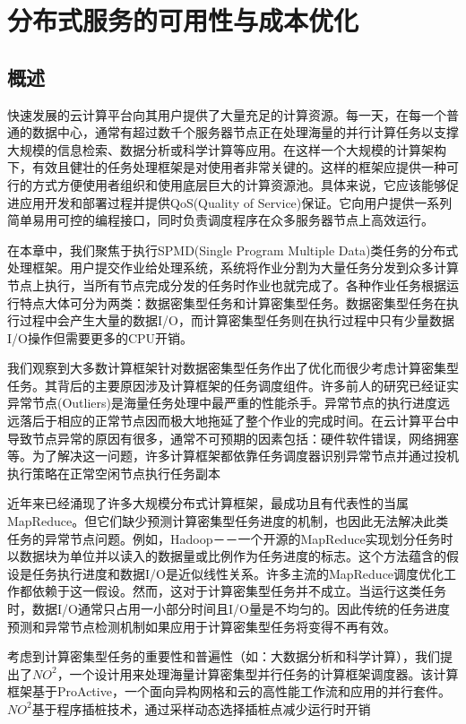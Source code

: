 \chapter{分布式服务的可用性与成本优化}
\label{cha:jupiter}

\section{概述}
\label{sec:ano}
快速发展的云计算平台向其用户提供了大量充足的计算资源。每一天，在每一个普通的数据中心，通常有超过数千个服务器节点正在处理海量的并行计算任务以支撑大规模的信息检索、数据分析或科学计算等应用。在这样一个大规模的计算架构下，有效且健壮的任务处理框架是对使用者非常关键的。这样的框架应提供一种可行的方式方便使用者组织和使用底层巨大的计算资源池。具体来说，它应该能够促进应用开发和部署过程并提供QoS(Quality of Service)保证。它向用户提供一系列简单易用可控的编程接口，同时负责调度程序在众多服务器节点上高效运行。

在本章中，我们聚焦于执行SPMD(Single Program Multiple Data)类任务的分布式处理框架。用户提交作业给处理系统，系统将作业分割为大量任务分发到众多计算节点上执行，当所有节点完成分发的任务时作业也就完成了。各种作业任务根据运行特点大体可分为两类：数据密集型任务和计算密集型任务。数据密集型任务在执行过程中会产生大量的数据I/O，而计算密集型任务则在执行过程中只有少量数据I/O操作但需要更多的CPU开销。

我们观察到大多数计算框架针对数据密集型任务作出了优化而很少考虑计算密集型任务。其背后的主要原因涉及计算框架的任务调度组件。许多前人的研究\cite{Zaharia:2008:IMP:1855741.1855744, Ananthanarayanan:2010:ROM:1924943.1924962}已经证实异常节点(Outliers)是海量任务处理中最严重的性能杀手。异常节点的执行进度远远落后于相应的正常节点因而极大地拖延了整个作业的完成时间。在云计算平台中导致节点异常的原因有很多，通常不可预期的因素包括：硬件软件错误，网络拥塞等。为了解决这一问题，许多计算框架都依靠任务调度器识别异常节点并通过投机执行策略在正常空闲节点执行任务副本

近年来已经涌现了许多大规模分布式计算框架，最成功且有代表性的当属MapReduce。但它们缺少预测计算密集型任务进度的机制，也因此无法解决此类任务的异常节点问题。例如，Hadoop－－一个开源的MapReduce实现划分任务时以数据块为单位并以读入的数据量或比例作为任务进度的标志。这个方法蕴含的假设是任务执行进度和数据I/O是近似线性关系。许多主流的MapReduce调度优化工作都依赖于这一假设。然而，这对于计算密集型任务并不成立。当运行这类任务时，数据I/O通常只占用一小部分时间且I/O量是不均匀的。因此传统的任务进度预测和异常节点检测机制如果应用于计算密集型任务将变得不再有效。

考虑到计算密集型任务的重要性和普遍性（如：大数据分析和科学计算），我们提出了$NO^2$，一个设计用来处理海量计算密集型并行任务的计算框架调度器。该计算框架基于ProActive，一个面向异构网格和云的高性能工作流和应用的并行套件。$NO^2$基于程序插桩技术，通过采样动态选择插桩点减少运行时开销

